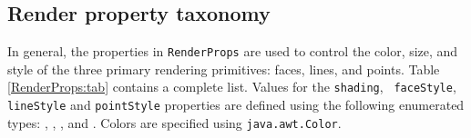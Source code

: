 \subsection{Render property taxonomy}

In general, the properties in {\tt RenderProps} are used to control
the color, size, and style of the three primary rendering
primitives: faces, lines, and points. Table \ref{RenderProps:tab}
contains a complete list. Values for the {\tt shading}, {\tt
faceStyle}, {\tt lineStyle} and {\tt pointStyle} properties are
defined using the following enumerated types:
, 
, 
, 
and 
.
Colors are specified using {\tt java.awt.Color}.

